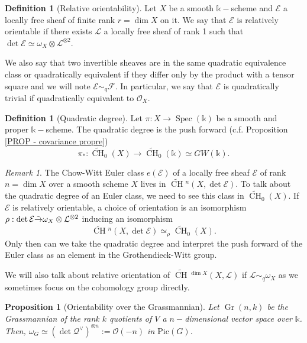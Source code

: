 \documentclass{amsart}
\theoremstyle{plain}%
\newtheorem{prop}[subsubsection]{Proposition}
\theoremstyle{remark}
\newtheorem{rmq}[subsubsection]{Remark}
\theoremstyle{definition}
\newtheorem{deff}[subsubsection]{Definition}
\newcommand{\cE}{\mathcal{E}}
\newcommand{\cF}{\mathcal{F}}
\newcommand{\cL}{\mathcal{L}}
\newcommand{\cO}{\mathcal{O}}
\newcommand{\cQ}{\mathcal{Q}}
\newcommand{\ek}{\mathbb{k}}
\newcommand{\GW}{GW}
\newcommand{\Chowtilde}[2][]{\widetilde{\operatorname{CH}}{}^{#1}\!\left(#2\right)}
\newcommand{\Chowtildecov}[2][]{\widetilde{\operatorname{CH}}_{#1}\left(#2\right)}
\newcommand{\simquad}{\sim_q}
\newcommand{\Picard}[1]{\mathrm{Pic}\left(#1\right)}
\newcommand{\isomr}{\Tilde{\to}}
\newcommand{\Spec}[1]{\operatorname{Spec}\left(#1\right)}
\newcommand{\Grass}{\operatorname{Gr}}
\begin{document}
\begin{deff}[Relative orientability]\label{DEF - orientabilite relative}
Let $X$ be a smooth $\ek-$scheme and $\cE$ a locally free sheaf of finite rank $r = \dim X$ on it. We say that $\cE$ is relatively orientable if there exists $\cL$ a locally free sheaf of rank 1 such that $\det \cE \simeq \omega_X \otimes \cL^{\otimes 2}.$ 

We also say that two invertible sheaves are in the same quadratic equivalence class or quadratically equivalent if they differ only by the product with a tensor square and we will note $\cE \simquad \cF$. In particular, we say that $\cE$ is quadratically trivial if quadratically equivalent to $\cO_X.$
\end{deff}


\begin{deff}[Quadratic degree]\label{DEF - degre quadratique}
Let $\pi : X\to \Spec{\ek}$ be a smooth and proper $\ek-$scheme. The quadratic degree is the push forward (c.f. Proposition \ref{PROP - covariance propre})
\[\pi_\ast : \Chowtildecov[0]{X} \to \Chowtildecov[0]{\ek}\simeq \GW(\ek).\]
\end{deff}

\begin{rmq}\label{RMQ - degre quad classe Euler}
The Chow-Witt Euler class $e(\cE)$ of a locally free sheaf $\cE$ of rank $n = \dim X$ over a smooth scheme $X$ lives in $\Chowtilde[n]{X,\det \cE}.$  To talk about the quadratic degree of an Euler class, we need to see this class in $\Chowtildecov[0]{X}.$ If $\cE$ is relatively orientable, a choice of orientation is an isomorphism $\rho : \det \cE \isomr \omega_X\otimes \cL^{\otimes 2}$ inducing an isomorphism 
\[\Chowtilde[n]{X,\det \cE} \simeq_\rho \Chowtildecov[0]{X}.\]
Only then can we take the quadratic degree and interpret the push forward of the Euler class as an element in the Grothendieck-Witt group.

We will also talk about relative orientation of $\Chowtilde[\dim X]{X,\cL}$ if $\cL \simquad \omega_X$ as we sometimes focus on the cohomology group directly. 
\end{rmq}


\begin{prop}[Orientability over the Grassmannian]\label{PROP - orientabilite grassmann}
Let $\Grass(n,k)$ be the Grassmannian of the rank $k$ quotients of $V$ a $n-$dimensional vector space over $\ek$. Then, $\omega_G \simeq (\det \cQ^\vee)^{\otimes n} := \cO(-n)$ in $\Picard{G}$. 
\end{prop}
\end{document}
